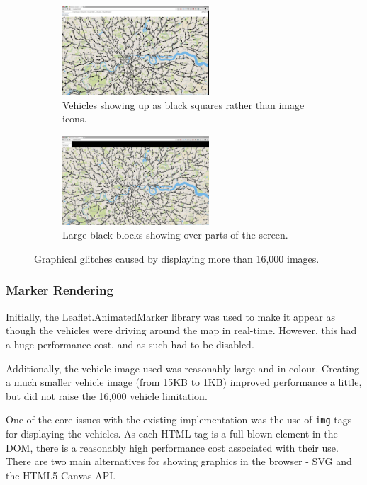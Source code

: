 \documentclass[ %
                    author={Alexander Hill},
                supervisor={Dr. Benjamin Sach},
                    degree={MEng},
                     title={MARMOSET},
                  subtitle={Multi-Agent Route Management using Online Simulation for Efficient Transportation},
                      type={research},
                      year={2016} ]{dissertation}
\begin{document}
\begin{figure}[h]
\centering
\begin{subfigure}[b]{0.4\textwidth}
    \centering
    \includegraphics[height=9em]{glitches-car}
    \caption{Vehicles showing up as black squares rather than image icons.}\label{fig:glitches-car}
\end{subfigure}
\hspace{3em}
\begin{subfigure}[b]{0.4\textwidth}
    \centering
    \includegraphics[height=9em]{glitches-chrome}
    \caption{Large black blocks showing over parts of the screen.}\label{fig:glitches-chrome}
\end{subfigure}
\caption{Graphical glitches caused by displaying more than 16,000 images.}
\end{figure}

\subsubsection{Marker Rendering}

Initially, the Leaflet.AnimatedMarker library was used to make it appear as
though the vehicles were driving around the map in real-time. However, this had a
huge performance cost, and as such had to be disabled.

Additionally, the vehicle image used was reasonably large and in colour.
Creating a much smaller vehicle image (from 15KB to 1KB) improved performance a
little, but did not raise the 16,000 vehicle limitation.

One of the core issues with the existing implementation was the use of
\texttt{img} tags for displaying the vehicles. As each HTML tag is a full blown
element in the DOM, there is a reasonably high performance cost associated with
their use. There are two main alternatives for showing graphics in the browser -
SVG and the HTML5 Canvas API.
\end{document}
